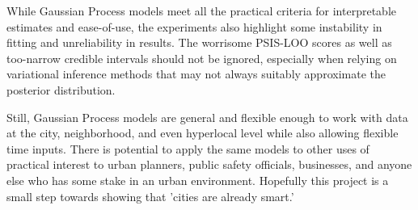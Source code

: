 While Gaussian Process models meet all the practical criteria for interpretable estimates and ease-of-use, the experiments also highlight some instability in fitting and unreliability in results. The worrisome PSIS-LOO scores as well as too-narrow credible intervals should not be ignored, especially when relying on variational inference methods that may not always suitably approximate the posterior distribution. \par

Still, Gaussian Process models are general and flexible enough to work with data at the city, neighborhood, and even hyperlocal level while also allowing flexible time inputs. There is potential to apply the same models to other uses of practical interest to urban planners, public safety officials, businesses, and anyone else who has some stake in an urban environment. Hopefully this project is a small step towards showing that 'cities are already smart.'
